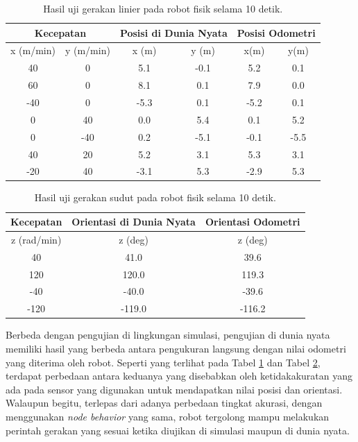 \begin{table}
  \caption{Hasil uji gerakan linier pada robot fisik selama 10 detik.}
  \label{tab:hasilujilinierdunianyata}
  \centering
  \begin{tabular}{cc|cc|cc}
    \toprule
    \multicolumn{2}{c|}{Kecepatan} &
    \multicolumn{2}{|c|}{Posisi di Dunia Nyata} &
    \multicolumn{2}{|c}{Posisi Odometri} \\
    \midrule
    x (m/min) & y (m/min) & x (m) & y (m) & x(m)  & y(m) \\
    \midrule
    40        & 0         & 5.1   & -0.1  & 5.2   & 0.1 \\
    60        & 0         & 8.1   & 0.1   & 7.9   & 0.0 \\
    -40       & 0         & -5.3  & 0.1   & -5.2  & 0.1 \\
    0         & 40        & 0.0   & 5.4   & 0.1   & 5.2 \\
    0         & -40       & 0.2   & -5.1  & -0.1  & -5.5 \\
    40        & 20        & 5.2   & 3.1   & 5.3   & 3.1 \\
    -20       & 40        & -3.1  & 5.3   & -2.9  & 5.3 \\
    \bottomrule
  \end{tabular}
\end{table}

\begin{table}
  \caption{Hasil uji gerakan sudut pada robot fisik selama 10 detik.}
  \label{tab:hasilujisudutdunianyata}
  \centering
  \begin{tabular}{c|c|c}
    \toprule
    Kecepatan   & Orientasi di Dunia Nyata  & Orientasi Odometri \\
    \midrule
    z (rad/min) & z (deg)                   & z (deg) \\
    \midrule
    40          & 41.0                      & 39.6 \\
    120         & 120.0                     & 119.3 \\
    -40         & -40.0                     & -39.6 \\
    -120        & -119.0                    & -116.2 \\
    \bottomrule
  \end{tabular}
\end{table}

Berbeda dengan pengujian di lingkungan simulasi, pengujian di dunia nyata memiliki hasil yang berbeda antara pengukuran langsung dengan nilai odometri yang diterima oleh robot.
Seperti yang terlihat pada Tabel \ref{tab:hasilujilinierdunianyata} dan Tabel \ref{tab:hasilujisudutdunianyata}, terdapat perbedaan antara keduanya yang disebabkan oleh ketidakakuratan yang ada pada sensor yang digunakan untuk mendapatkan nilai posisi dan orientasi.
Walaupun begitu, terlepas dari adanya perbedaan tingkat akurasi, dengan menggunakan \emph{node behavior} yang sama, robot tergolong mampu melakukan perintah gerakan yang sesuai ketika diujikan di simulasi maupun di dunia nyata.
